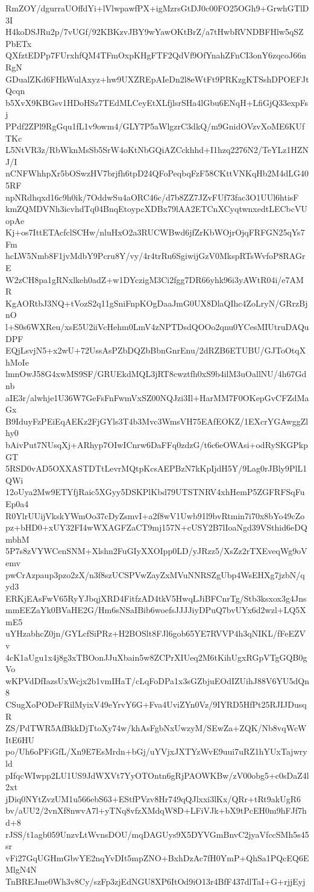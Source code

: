 RmZOY/dgurraUOffdYi+lVlwpawfPX+igMzrsGtDJ0c00FO25OGh9+GrwhGTlD3I
H4koDSJRu2p/7vUGf/92KBKzvJBY9wYawOKtBrZ/a7tHwbRVNDBFHlw5qSZPbETx
QXfztEDPp7FUrxhfQM4TFmOxpKHgFTF2QdVf9OfYnahZFnCI3onY6zqcoJ66nRgN
GDualZKd6FHkWulAxyz+hw9UXZREpAIeDn2l8eWtFt9PRKzgKTSshDPOEFJtQcqn
b5XvX9KBGsv1HDoHSz7TEdMLCeyEtXLfjlsrSHa4lGbu6ENqH+LfiGjQ33expFsj
PPdf2ZPl9RgGqu1fL1v9owm4/GLY7P5aWlgzrC3dkQ/m9GnidOVzvXoME6KUfTKc
L5NtVR3z/RbWknMsSb5SrW4oKtNbGQiAZCckhhd+I1hzq2276N2/TeYLz1HZNJ/I
nCNFWhhpXr5bOSwzHV7brjfh6tpD24QFoPeqbqFzF58CKttVNKqHb2M4dLG405RF
npNRdhqxd16c9h0ik/7OddwSu4aORC46c/d7b8ZZ7JZvFUf73fac3O1UUl6htisF
kmZQMDVNh3icvhdTq04BnqEtoypcXDBx79lAA2ETCnXCyqtwnxedtLECbcVUopAe
Kj+os7IttETAcfclSCHw/nluHxO2a3RUCWBwd6jfZrKbWOjrOjqFRFGN25qYs7Fm
hcLW5Nmb8F1jvMdbY9Pcru8Y/vy/4r4trRu6SgiwijGzV0MkspRTsWvfoP8RAGrE
W2zCH8pa1gRNxlkeh0adZ+w1DYczigM3Ci2fgg7DR66yhk96i3yAWtR04i/e7AMR
KgAORtbJ3NQ+tVozS2q11gSniFnpKOgDaaJmG0UX8DlaQIhc4ZoLryN/GRrzBjnO
l+S0s6WXReu/xsE5U2iiVcHehm0LmV4zNPTDsdQOOo2qnu0YCesMIUtruDAQuDPF
EQjLsvjN5+x2wU+72UssAsPZbDQZbBbnGnrEnu/2dRZB6ETUBU/GJToOtqXhMoIe
lmnOwJ58G4xwMS9SF/GRUEkdMQL3jRT8cwztfh0xS9b4ilM3uOallNU/4h67Gdnb
aIE3r/alwhje1U36W7GeFsFnFwmVxSZ00NQJzi3Il+HarMM7F0OKepGvCFZdMaGx
B9IduyFzPEiEqAEKz2FjGYls3T4b3Mvc3WmsVH75EAfEOKZ/1EXcrYGAwggZlhy0
bAivPut7NUsqXj+ARhyp7OIwICnrw6DaFFq0zdzG/t6c6eOWAsi+odRySKGPkpGT
5RSD0vAD5OXXASTDTtLevrMQtpKcsAEPBzN7kKpIjdH5Y/9Lag0rJBly9PlL1QWi
12oUya2Mw9ETYfjRaic5XGyy5DSKPlKbd79UTSTNRV4xhHemP5ZGFRFSqFuEp0a4
R0YlrUUijVkskYWmOo37cDyZsmvI+a2f8wV1Uwb91l9bvRtmin7i70x8bYo49cZo
pz+bHD0+xUY32FI4wWXAGFZaCT9mj157N+cUSY2B7lIoaNgd39VSthid6eDQmbhM
5P7s8zVYWCenSNM+Xlshn2FuGIyXXOIpp0LD/yJRzz5/XsZz2rTXEveqWg9oVemv
pwCrAzpaup3pzo2zX/n3f8szUCSPVwZayZxMVuNNRSZgUbp4WsEHXg7jzbN/qyd3
ERKjEAsFwV65RyYJbqjXRD4FitfzAD4tkV5HwqLJiBFCnrTg/Stb3ksxox3g4Jns
mmEEZaYk0BVaHE2G/Hm6sNSaIBib6woefsJJJJiyDPuQ7bvUYx6d2wzl+LQ5XmE5
uYHzabhcZ0jn/GYLcfSiPRz+H2BOSlt8FJl6gob65YE7RVVP4h3qNIKL/fFeEZVv
4cK1aUgu1x4j8g3xTBOonJJuXbain5w8ZCPrXIUeq2M6tKihUgxRGpVTgGQB0gVo
wKPVdDfIazsUxWcjx2b1vmIHaT/cLqFoDPa1x3sGZbjuEOdIZUihJ88V6YU5dQn8
CSugXoPODeFRilMyixV49eYrvY6G+Fva4UviZYn0Vz/9IYRD5HfPt25RJIJDusqR
ZS/PdTWR5AfBkkDjTtoXy74w/khAsFgbNxUwzyM/SEwZa+ZQK/Nb8vqWcWItE6HU
po/Uh6oPFiGfL/Xn9E7EsMrdn+bGj/uYVjxJXTYzWvE9uui7uRZ1hYUxTajwryld
pIfqcWIwpp2LU1US9JdWXVt7YyOTOntn6gRjPAOWKBw/zV00obg5+c0sDaZ4l2xt
jDiq0NYtZvzUM1u566ebS63+EStfPVzv8Hr749qQJlxxi3lKx/QRr+tRt9akUgR6
bv/aUU2/2vnXf8nwvA7l+yTNq8vfzXMdqW8D+LFiVJk+bX9tPcEH0m9hFJf7hd+8
rJSS/t1agb059UnzvLtWvnsDOU/mqDAGUys9X5DYVGmBnvC2jyaVfccSMh5s45sr
vFi27GqUGHmGbvYE2nqYvDIt5mpZNO+BxhDzAc7fH0YmP+QhSa1PQcEQ6EMlgN4N
TnBREJme0Wh3v8Cy/szFp3zjEdNGU8XP6ItOd9iO13r4BfF437dlTaI+G+rjjEyj
